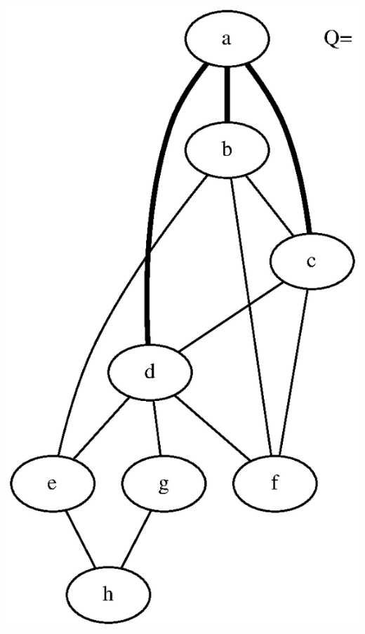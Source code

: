 \documentclass{article}
\begin{document}
\vspace{1em}
\includegraphics[height=.3\textheight]{bfs_undirected_classroom_01.eps}
\vspace{1em}
\end{document}
